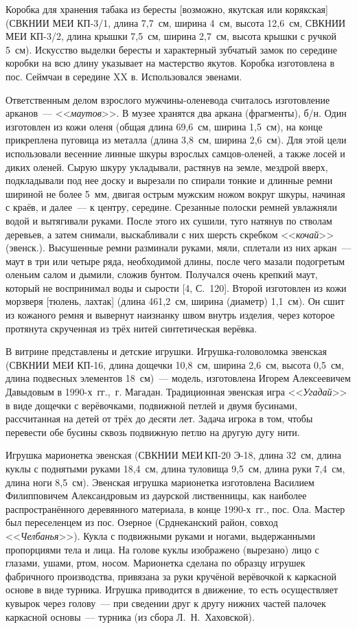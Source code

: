 Коробка для хранения табака из бересты [возможно, якутская или корякская] (СВКНИИ МЕИ КП-3/1, длина 7,7~см, ширина 4~см, высота 12,6~см, СВКНИИ МЕИ КП-3/2, длина крышки 7,5~см, ширина 2,7~см, высота крышки с ручкой 5~см). Искусство выделки бересты и характерный зубчатый замок по середине коробки на всю длину указывает на мастерство якутов. Коробка изготовлена в пос. Сеймчан в середине XX в. Использовался эвенами.

Ответственным делом взрослого мужчины-оленевода считалось изготовление арканов~--- <<\textit{маутов}>>. В музее хранятся два аркана (фрагменты), б/н. Один изготовлен из кожи оленя (общая длина 69,6~см, ширина 1,5~см), на конце прикреплена пуговица из металла (длина 3,8~см, ширина 2,6~см). Для этой цели использовали весенние линные шкуры взрослых самцов-оленей, а также лосей и диких оленей. Сырую шкуру укладывали, растянув на земле, мездрой вверх, подкладывали под нее доску и вырезали по спирали тонкие и длинные ремни шириной не более 5~мм, двигая острым мужским ножом вокруг шкуры, начиная с краёв, и далее~--- к центру, середине. Срезанные полоски ремней увлажняли водой и вытягивали руками. После этого их сушили, туго натянув по стволам деревьев, а затем снимали, выскабливали с них шерсть скребком <<\textit{кочай}>> (эвенск.). Высушенные ремни разминали руками, мяли, сплетали из них аркан~--- маут в три или четыре ряда, необходимой длины, после чего мазали подогретым оленьим салом и дымили, сложив бунтом. Получался очень крепкий маут, который не воспринимал воды и сырости [4, С.~120]. Второй изготовлен из кожи морзверя [тюлень, лахтак] (длина 461,2~см, ширина (диаметр) 1,1~см). Он сшит из кожаного ремня и вывернут наизнанку швом внутрь изделия, через которое протянута скрученная из трёх нитей синтетическая верёвка.

В витрине представлены и детские игрушки. Игрушка-головоломка эвенская (СВКНИИ МЕИ КП-16, длина дощечки 10,8~см, ширина 2,6~см, высота 0,5~см, длина подвесных элементов 18~см)~--- модель, изготовлена Игорем Алексеевичем Давыдовым в 1990-х~гг.,~г. Магадан. Традиционная эвенская игра <<\textit{Угадай}>> в виде дощечки с верёвочками, подвижной петлей и двумя бусинами, рассчитанная на детей от трёх до десяти лет. Задача игрока в том, чтобы перевести обе бусины сквозь подвижную петлю на другую дугу нити.

Игрушка марионетка эвенская (СВКНИИ МЕИ\,КП-20 Э-18, длина 32~см, длина куклы с поднятыми руками 18,4~см, длина туловища 9,5~см, длина руки 7,4~см, длина ноги 8,5~см). Эвенская игрушка марионетка изготовлена Василием Филипповичем Александровым из даурской лиственницы, как наиболее распространённого деревянного материала, в конце 1990-х~гг., пос. Ола. Мастер был переселенцем из пос. Озерное (Срднеканский район, совход <<\textit{Челбанья}>>). Кукла с подвижными руками и ногами, выдержанными пропорциями тела и лица. На голове куклы изображено (вырезано) лицо с глазами, ушами, ртом, носом. Марионетка сделана по образцу игрушек фабричного производства, привязана за руки кручёной верёвочкой к каркасной основе в виде турника. Игрушка приводится в движение, то есть осуществляет кувырок через голову~--- при сведении друг к другу нижних частей палочек каркасной основы~--- турника (из сбора Л.~Н.~Хаховской).

